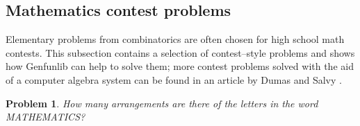 \documentclass{article}
\theoremstyle{plain}
\newtheorem{prob}{Problem}
\begin{document}
\subsection{Mathematics contest problems} \label{sec:contest}

Elementary problems from combinatorics are often chosen for high school math
contests.
This subsection contains a selection of contest--style problems and shows how
Genfunlib can help to solve them;
more contest problems solved with the aid of a computer algebra system can be
found in an article by Dumas and Salvy \cite{putnam}.

\begin{prob}
  How many arrangements are there of the letters in the word MATHEMATICS?
  \cite{pretest}
\end{prob}
\end{document}
